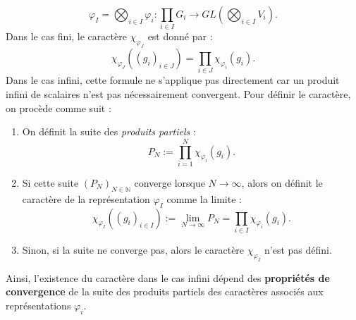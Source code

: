 \documentclass[a4paper, 14pt]{report}
\begin{document}
\[
\varphi_I = \bigotimes_{i \in I} \varphi_i : \prod_{i \in I} G_i \longrightarrow GL\left( \bigotimes_{i \in I} V_i \right).
\]
Dans le cas fini, le caractère \( \chi_{\varphi_J} \) est donné par :
\[
\chi_{\varphi_J}((g_i)_{i \in J}) = \prod_{i \in J} \chi_{\varphi_i}(g_i).
\]
Dans le cas infini, cette formule ne s’applique pas directement car un produit infini de scalaires n’est pas nécessairement convergent. Pour définir le caractère, on procède comme suit :
\begin{enumerate}
	\item On définit la suite des \textit{produits partiels} :
	\[
	P_N := \prod_{i=1}^{N} \chi_{\varphi_i}(g_i).
	\]
	
	\item Si cette suite \( (P_N)_{N \in \mathbb{N}} \) converge lorsque \( N \to \infty \), alors on définit le caractère de la représentation \( \varphi_I \) comme la limite :
	\[
	\chi_{\varphi_I}((g_i)_{i \in I}) := \lim_{N \to \infty} P_N = \prod_{i \in I} \chi_{\varphi_i}(g_i).
	\]
	
	\item Sinon, si la suite ne converge pas, alors le caractère \( \chi_{\varphi_I} \) n’est pas défini.
\end{enumerate}
Ainsi, l’existence du caractère dans le cas infini dépend des \textbf{propriétés de convergence} de la suite des produits partiels des caractères associés aux représentations \( \varphi_i \).
\end{document}
